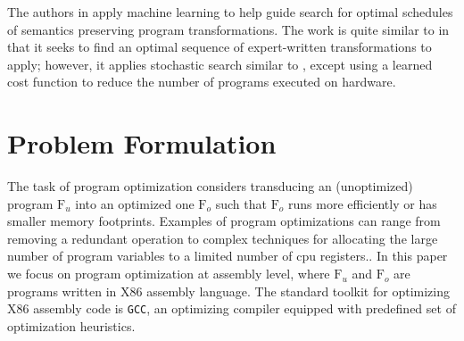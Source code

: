 \documentclass{article}
\newcommand\p{\ensuremath{{\mathrm{F}_u}}}
\newcommand\popt{\ensuremath{{\mathrm{F}_o}}}
\begin{document}
The authors in \cite{chen2018learning} apply machine learning to help guide search for optimal schedules of semantics preserving program transformations. The work is quite similar to \cite{chen2019learning} in that it seeks to find an optimal sequence of expert-written transformations to apply; however, it applies stochastic search similar to \cite{schkufza2013stochastic}, except using a learned cost function to reduce the number of programs executed on hardware. 

\section{Problem Formulation}

The task of program optimization considers transducing an (unoptimized) program $\p$ into an optimized one $\popt$ such that $\popt$ runs more efficiently or has smaller memory footprints.
Examples of program optimizations can range from removing a redundant operation to complex techniques for allocating the large number of program variables to a limited number of cpu registers.. 
In this paper we focus on program optimization at assembly level, where $\p$ and $\popt$ are programs written in X86 assembly language.
The standard toolkit for optimizing X86 assembly code is \texttt{GCC}, an optimizing compiler equipped with predefined set of optimization heuristics.

\end{document}
